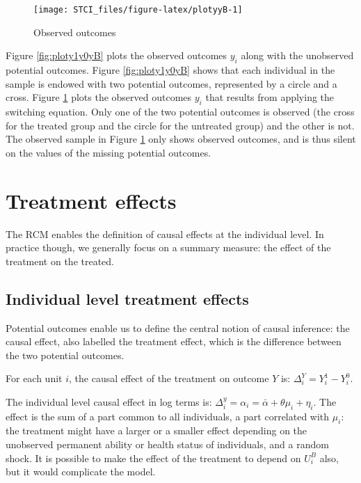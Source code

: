\documentclass[]{book}
\theoremstyle{definition}
\theoremstyle{definition}
\theoremstyle{definition}
\theoremstyle{remark}
\let\BeginKnitrBlock\begin \let\EndKnitrBlock\end
\begin{document}
\begin{figure}

{\centering \texttt{[image: STCI\_files/figure-latex/plotyyB-1]} 

}

\caption{Observed outcomes}\label{fig:plotyyB}
\end{figure}

Figure \ref{fig:ploty1y0yB} plots the observed outcomes \(y_i\) along
with the unobserved potential outcomes. Figure \ref{fig:ploty1y0yB}
shows that each individual in the sample is endowed with two potential
outcomes, represented by a circle and a cross. Figure \ref{fig:plotyyB}
plots the observed outcomes \(y_i\) that results from applying the
switching equation. Only one of the two potential outcomes is observed
(the cross for the treated group and the circle for the untreated group)
and the other is not. The observed sample in Figure \ref{fig:plotyyB}
only shows observed outcomes, and is thus silent on the values of the
missing potential outcomes.

\section{Treatment effects}\label{treatment-effects}

The RCM enables the definition of causal effects at the individual
level. In practice though, we generally focus on a summary measure: the
effect of the treatment on the treated.

\subsection{Individual level treatment
effects}\label{individual-level-treatment-effects}

Potential outcomes enable us to define the central notion of causal
inference: the causal effect, also labelled the treatment effect, which
is the difference between the two potential outcomes.

\BeginKnitrBlock{definition}[Individual level treatment effect]
\protect\hypertarget{def:causaleff}{}{\label{def:causaleff}
\iffalse (Individual level treatment effect) \fi{} }For each unit \(i\),
the causal effect of the treatment on outcome \(Y\) is:
\(\Delta^Y_i=Y_i^1-Y_i^0\).
\EndKnitrBlock{definition}

\BeginKnitrBlock{example}
\protect\hypertarget{exm:unnamed-chunk-7}{}{\label{exm:unnamed-chunk-7} }The
individual level causal effect in log terms is:
\(\Delta^y_i=\alpha_i=\bar{\alpha}+\theta\mu_i+\eta_i\). The effect is
the sum of a part common to all individuals, a part correlated with
\(\mu_i\): the treatment might have a larger or a smaller effect
depending on the unobserved permanent ability or health status of
individuals, and a random shock. It is possible to make the effect of
the treatment to depend on \(U_i^B\) also, but it would complicate the
model.
\EndKnitrBlock{example}
\end{document}
